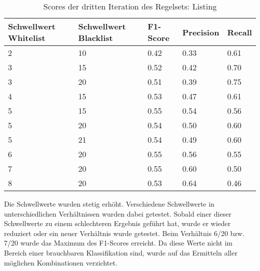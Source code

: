 \begin{table}[H]
	\caption{Scores der dritten Iteration des Regelsets: Listing}
	\centering
\begin{tabular}{|l|l|l|l|l|}
	\hline
	Schwellwert Whitelist & Schwellwert Blacklist & F1-Score & Precision & Recall\\
	\hline
	2 & 10 & 0.42 & 0.33 & 0.61 \\
	3 & 15 & 0.52 & 0.42 & 0.70 \\
	3 & 20 & 0.51 & 0.39 & 0.75 \\
	4 & 15 & 0.53 & 0.47 & 0.61 \\
	5 & 15 & 0.55 & 0.54 & 0.56 \\
	5 & 20 & 0.54 & 0.50 & 0.60 \\
	5 & 21 & 0.54 & 0.49 & 0.60 \\
	6 & 20 & 0.55 & 0.56 & 0.55 \\
	7 & 20 & 0.55 & 0.60 & 0.50 \\
	8 & 20 & 0.53 & 0.64 & 0.46 \\
	\hline
\end{tabular}
\end{table}
Die Schwellwerte wurden stetig erhöht.
Verschiedene Schwellwerte in unterschiedlichen Verhältnissen wurden dabei getestet.
Sobald einer dieser Schwellwerte zu einem schlechteren Ergebnis geführt hat, wurde er wieder reduziert oder ein neuer Verhältnis wurde getestet.
Beim Verhältnis 6/20 bzw. 7/20 wurde das Maximum des F1-Scores erreicht.
Da diese Werte nicht im Bereich einer brauchbaren Klassifikation sind, wurde auf das Ermitteln aller möglichen Kombinationen verzichtet.
